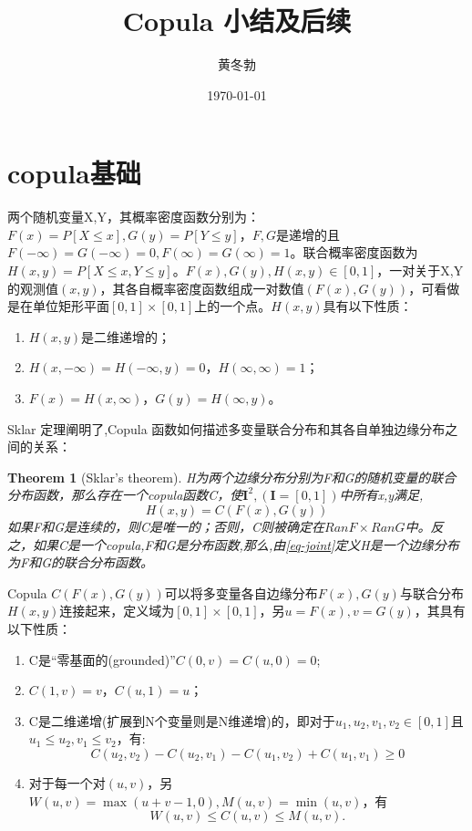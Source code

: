 \documentclass[UTF8]{ctexart}
\title{\heiti Copula 小结及后续}
\author{\kaishu 黄冬勃}
\date{\today}
\newtheorem{theorem}{Theorem}[section]
\begin{document}
\maketitle

\section{copula基础}
两个随机变量X,Y，其概率密度函数分别为：$F(x) = P[X\leq x], G(y) = P[Y \leq y]$，$F,G$是递增的且$F(-\infty)=G(-\infty)=0,F(\infty)=G(\infty)=1$。联合概率密度函数为$H(x,y) = P[X\leq x, Y\leq y]$。$F(x),G(y),H(x,y) \in [0,1]$，一对关于X,Y的观测值$(x,y)$，其各自概率密度函数组成一对数值$(F(x),G(y))$，可看做是在单位矩形平面$[0,1]\times[0,1]$上的一个点。$H(x,y)$具有以下性质：
\begin{enumerate}[1.]
    \item $H(x,y)$是二维递增的；
    \item $H(x,-\infty) = H(-\infty,y) = 0$，$H(\infty,\infty)=1$；
    \item $F(x) = H(x,\infty)$，$G(y) = H(\infty,y)$。
\end{enumerate}

Sklar 定理阐明了,Copula 函数如何描述多变量联合分布和其各自单独边缘分布之间的关系\cite{Bill2000An}：
\begin{theorem}[Sklar's theorem]
    H为两个边缘分布分别为F和G的随机变量的联合分布函数，那么存在一个copula函数C，使$\mathbf{I}^2, (\mathbf{I}=[0,1])$中所有x,y满足,
    \begin{equation}
        H(x,y) = C(F(x),G(y))
        \label{eq-joint}
    \end{equation}
    如果F和G是连续的，则C是唯一的；否则，C则被确定在$RanF\times RanG$中。反之，如果C是一个copula,F和G是分布函数,那么,由\cref{eq-joint}定义H是一个边缘分布为F和G的联合分布函数。
    \label{thr-sklar}
\end{theorem}
Copula $C(F(x),G(y))$可以将多变量各自边缘分布$F(x),G(y)$与联合分布$H(x,y)$连接起来，定义域为$[0,1]\times[0,1]$，另$u=F(x),v=G(y)$，其具有以下性质：
\begin{enumerate}[1.]
    \item C是``零基面的(grounded)''$C(0,v)=C(u,0)=0$;
    \item $C(1,v) = v$，$C(u,1)=u$；
    \item C是二维递增(扩展到N个变量则是N维递增)的，即对于$u_1,u_2,v_1,v_2 \in [0,1]$且$u_1 \leq u_2, v_1 \leq v_2$，有:
        \begin{equation*}
            C(u_2,v_2) - C(u_2,v_1) - C(u_1,v_2) + C(u_1,v_1) \geq 0
        \end{equation*}
    \item 对于每一个对$(u,v)$，另$W(u,v) = \max(u+v-1,0),M(u,v) = \min(u,v)$，有
        \begin{equation}
            W(u,v) \leq C(u,v) \leq M(u,v).
            \label{eq-domain}
        \end{equation}
\end{enumerate}
\end{document}
